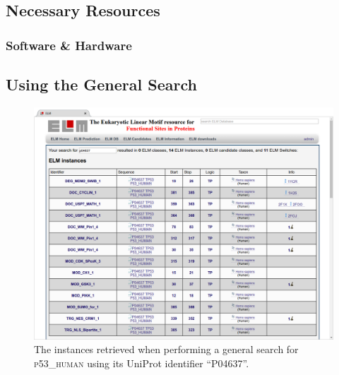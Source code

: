 \documentclass[12pt]{article}
\newcommand\uniprot[1]{%
	\textsc{\lowercase{#1}}%
}
\begin{document}
%
%
\subsection*{Necessary Resources}
\subsubsection*{Software \& Hardware}


%
%
\subsection*{Using the General Search}
\label{subsec:general_search_using}


\begin{enumerate}

\begin{figure}[h!]
	\centering
	\includegraphics[width=\textwidth]{Figures/general_search/P04637_instances.png}
	\caption{
		The instances retrieved when performing a general search for
		\uniprot{P53\_HUMAN} using its UniProt identifier ``P04637''.
	}
	\label{fig:general_search_P04637_instances}
\end{figure}


\end{enumerate}
\end{document}
